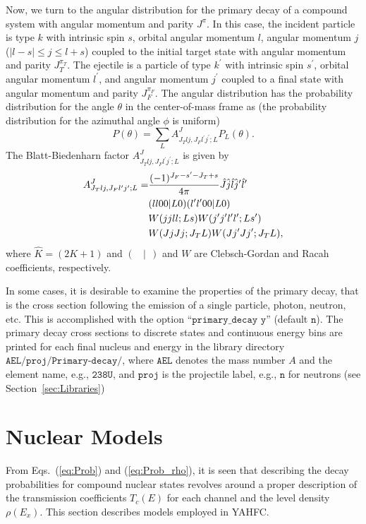 \documentclass[
10pt,
showpacs,preprintnumbers,footinbib,
amsfonts,amsmath,amssymb,
aps,
prc,twocolumn,groupedaddress,superscriptaddress,
showkeys,
nofootinbib
]{revtex4-1}
\begin{document}
Now, we turn to the angular distribution for the primary decay of a compound system with angular momentum and parity $J^\pi$. In this case, the incident particle is type  $k$ with intrinsic spin $s$, orbital angular momentum $l$, angular momentum $j$ ($|l-s| \le j \le l+s$) coupled to the initial target state with angular momentum and parity $J_T^{\pi_T}$. The ejectile is a particle of type $k^\prime$ with intrinsic spin $s^\prime$, orbital angular momentum $l^\prime$, and angular momentum $j^\prime$ coupled to a final state with angular momentum and parity $J_F^{\pi_F}$. The angular distribution has the probability distribution for the angle $\theta$ in the center-of-mass frame as (the probability distribution for the azimuthal angle $\phi$ is uniform)
\begin{equation}
P(\theta) = \sum_L A^J_{J_Tlj,J_Fl^\prime j^\prime ;L} P_L(\theta).
\end{equation}
The Blatt-Biedenharn factor $A^J_{J_Tlj,J_Fl^\prime j^\prime ;L}$ is given by
\begin{align}
A^J_{J_Tlj,J_Fl^\prime j^\prime ;L} = & \frac{(-1)^{J_F-s^\prime-J_T+s}}{4\pi} \hat J \hat j \hat l \hat j^\prime \hat l^\prime \notag\\
 & (ll00|L0)(l^\prime l^\prime 00|L0)\notag\\
 & W(jjll;Ls)W(j^\prime j^\prime l^\prime l^\prime; L s^\prime) \notag \\
 & W(JjJj;J_TL) W(Jj^\prime Jj^\prime ;J_TL),
 \label{eq:Pri-Ang}
\end{align}
where $\hat K = (2K+1)$ and $(~~~~|~~)$ and $W$ are Clebsch-Gordan and Racah coefficients, respectively.

In some cases, it is desirable to examine the properties of the primary decay, that is the cross section following the emission of a single particle, photon, neutron, etc. This is accomplished with the option ``${\texttt{primary\_decay y}}$'' (default ${\texttt{n}}$). The primary decay cross sections to discrete states and continuous energy bins are printed for each final nucleus and energy in the library directory ${\texttt{AEL/proj/Primary-decay/}}$, where ${\texttt{AEL}}$ denotes the mass number $A$ and the element name, e.g., ${\texttt{238U}}$, and ${\texttt{proj}}$ is the projectile label, e.g., ${\texttt{n}}$ for neutrons (see Section~\ref{sec:Libraries})

\section{Nuclear Models}
From Eqs.~(\ref{eq:Prob}) and (\ref{eq:Prob_rho}), it is seen that describing the decay probabilities for compound nuclear states revolves around a proper description of the transmission coefficients $T_c(E)$ for each channel and the level density $\rho(E_x)$. This section describes models employed in YAHFC.
\end{document}
